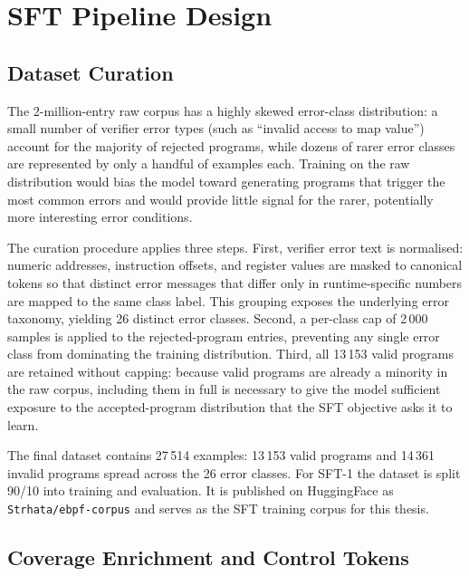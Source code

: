 \section{SFT Pipeline Design}
\label{sec:sft-design}

\subsection{Dataset Curation}
\label{sec:dataset}

The 2-million-entry raw corpus has a highly skewed error-class distribution:
a small number of verifier error types (such as ``invalid access to map value'')
account for the majority of rejected programs, while dozens of rarer error classes
are represented by only a handful of examples each.
Training on the raw distribution would bias the model toward generating programs
that trigger the most common errors and would provide little signal for the
rarer, potentially more interesting error conditions.

The curation procedure applies three steps.
First, verifier error text is normalised: numeric addresses, instruction offsets,
and register values are masked to canonical tokens so that distinct error messages
that differ only in runtime-specific numbers are mapped to the same class label.
This grouping exposes the underlying error taxonomy, yielding 26 distinct error
classes.
Second, a per-class cap of 2\,000 samples is applied to the rejected-program
entries, preventing any single error class from dominating the training
distribution.
Third, all 13\,153 valid programs are retained without capping: because valid
programs are already a minority in the raw corpus, including them in full is
necessary to give the model sufficient exposure to the accepted-program
distribution that the SFT objective asks it to learn.

The final dataset contains 27\,514 examples: 13\,153 valid programs and 14\,361
invalid programs spread across the 26 error classes.
For SFT-1 the dataset is split 90/10 into training and evaluation.
It is published on HuggingFace as \texttt{Strhata/ebpf-corpus} and serves as the
SFT training corpus for this thesis.

\subsection{Coverage Enrichment and Control Tokens}
\label{sec:enrichment}

